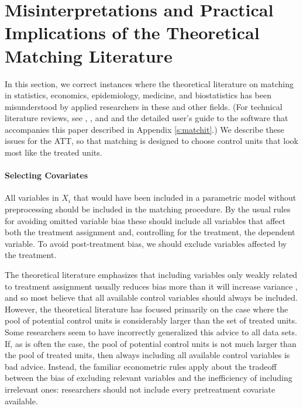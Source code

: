 \documentclass[11pt,titlepage]{article}
\begin{document}
\section{Misinterpretations and Practical Implications of the 
  Theoretical Matching Literature}\label{s:choose}

In this section, we correct instances where the theoretical literature
on matching in statistics, economics, epidemiology, medicine, and
biostatistics has been misunderstood by applied researchers in these
and other fields.  (For technical literature reviews, see
\citet{Imbens04}, \citet{Rosenbaum02}, and \citet{Stuart04} and the
detailed user's guide to the software that accompanies this paper
described in Appendix \ref{s:matchit}.)  We describe these issues for
the ATT, so that matching is designed to choose control units that
look most like the treated units.

\paragraph{Selecting Covariates}
All variables in $X_i$ that would have been included in a parametric
model without preprocessing should be included in the matching
procedure.  By the usual rules for avoiding omitted variable bias
these should include all variables that affect both the treatment
assignment and, controlling for the treatment, the dependent variable.
To avoid post-treatment bias, we should exclude variables affected by
the treatment.

The theoretical literature emphasizes that including variables only
weakly related to treatment assignment usually reduces bias more than
it will increase variance \citep{RubTho96, HecIchSmi98}, and so most
believe that all available control variables should always be
included.  However, the theoretical literature has focused primarily
on the case where the pool of potential control units is considerably
larger than the set of treated units.  Some researchers seem to have
incorrectly generalized this advice to all data sets.  If, as is often
the case, the pool of potential control units is not much larger than
the pool of treated units, then always including all available control
variables is bad advice.  Instead, the familiar econometric rules
apply about the tradeoff between the bias of excluding relevant
variables and the inefficiency of including irrelevant ones:
researchers should not include every pretreatment covariate available.
\end{document}
